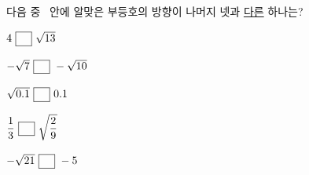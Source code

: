 다음 중 \blank\ 안에 알맞은 부등호의 방향이 나머지 넷과 \underline{다른} 하나는?
\begin{choicesii}{\rule[-3ex]{0pt}{8ex}$4\ \blank\ \sqrt{13}$}{\rule[-3ex]{0pt}{8ex}$-\sqrt{7}\ \blank\ -\sqrt{10}$}{\rule[-3ex]{0pt}{8ex}$\sqrt{0.1}\ \blank\ 0.1$}{\rule[-3ex]{0pt}{8ex}$\dfrac{1}{3}\ \blank\ \sqrt{\dfrac{2}{9}}$}{\rule[-3ex]{0pt}{8ex}$-\sqrt{21}\ \blank\ -5$}\end{choicesii}

